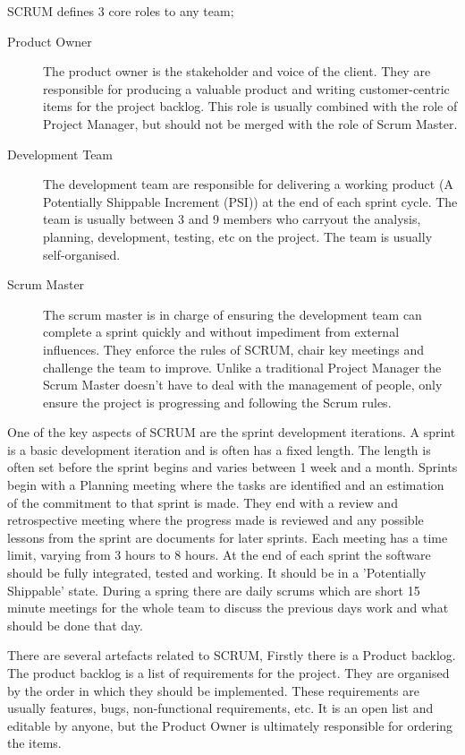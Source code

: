 \documentclass[11pt,a4paper]{article}
\begin{document}
SCRUM defines 3 core roles to any team;

\begin{description}
\item[Product Owner] The product owner is the stakeholder and voice of the client. They are responsible for producing a valuable product and writing customer-centric items for the project backlog. This role is usually combined with the role of Project Manager, but should not be merged with the role of Scrum Master. 
\item[Development Team] The development team are responsible for delivering a working product (A Potentially Shippable Increment (PSI)) at the end of each sprint cycle. The team is usually between 3 and 9 members who carryout the analysis, planning, development, testing, etc on the project. The team is usually self-organised.
\item[Scrum Master] The scrum master is in charge of ensuring the development team can complete a sprint quickly and without impediment from external influences. They enforce the rules of SCRUM, chair key meetings and challenge the team to improve. Unlike a traditional Project Manager the Scrum Master doesn't have to deal with the management of people, only ensure the project is progressing and following the Scrum rules. 
\end{description}%

One of the key aspects of SCRUM are the sprint development iterations. A sprint is a basic development iteration and is often has a fixed length. The length is often set before the sprint begins and varies between 1 week and a month. Sprints begin with a Planning meeting where the tasks are identified and an estimation of the commitment to that sprint is made. They end with a  review and retrospective meeting where the progress made is reviewed and any possible lessons from the sprint are documents for later sprints. Each meeting has a time limit, varying from 3 hours to 8 hours. At the end of each sprint the software should be fully integrated, tested and working. It should be in a 'Potentially Shippable' state. During a spring there are daily scrums which are short 15 minute meetings for the whole team to discuss the previous days work and what should be done that day. 

There are several artefacts related to SCRUM, Firstly there is a Product backlog. The product backlog is a list of requirements for the project. They are organised by the order in which they should be implemented. These requirements are usually features, bugs, non-functional requirements, etc. It is an open list and editable by anyone, but the Product Owner is ultimately responsible for ordering the items. 
\end{document}
